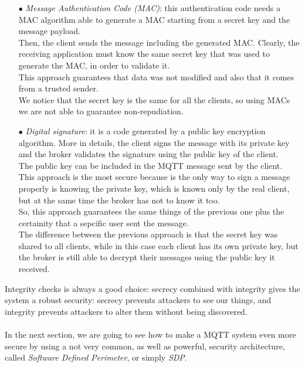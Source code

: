 \documentclass[12pt]{report}
\begin{document}
{\begin{itemize}
\item[$\bullet$] \emph{Message Authentication Code (MAC)}: this authentication code needs a MAC algorithm able to generate a MAC starting from a secret key and the message payload.\\
Then, the client sends the message including the generated MAC.
Clearly, the receiving application must know the same secret key that was used to generate the MAC, in order to validate it.\\
This approach guarantees that data was not modified and also that it comes from a trusted sender.\\
We notice that the secret key is the same for all the clients, so using MACs we are not able to guarantee non-repudiation.

\item[$\bullet$] \emph{Digital signature}: it is a code generated by a public key encryption algorithm. More in details, the client signs the message with its private key and the broker validates the signature using the public key of the client.\\
The public key can be included in the MQTT message sent by the client.\\
This approach is the most secure because is the only way to sign a message properly is knowing the private key, which is known only by the real client, but at the same time the broker has not to know it too.\\
So, this approach guarantees the same things of the previous one plus the certainity that a sepcific user sent the message.\\
The difference between the previous approach is that the secret key was shared to all clients, while in this case each client has its own private key, but the broker is still able to decrypt their messages using the public key it received.\\
\end{itemize}

Integrity checks is always a good choice: secrecy combined with integrity gives the system a robust security: secrecy prevents attackers to see our things, and integrity prevents attackers to alter them without being discovered.\\\\
In the next section, we are going to see how to make a MQTT system even more secure by using a not very common, as well as powerful, security architecture, called \emph{Software Defined Perimeter}, or simply \emph{SDP}.\\


}
\end{document}
